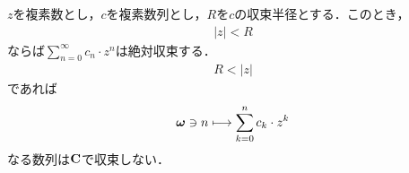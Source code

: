 	\begin{screen}
		\begin{thm}
		\label{thm:absolutely_converge_inside_the_convergence_circle}
			$z$を複素数とし，$c$を複素数列とし，$R$を$c$の収束半径とする．このとき，
			\begin{align}
				|z| < R
			\end{align}
			ならば$\sum_{n=0}^{\infty} c_n \cdot z^n$は絶対収束する．
			\begin{align}
				R < |z|
			\end{align}
			であれば
			\begin{align}
				{\boldsymbol \omega} \ni n \longmapsto \sum_{k=0}^{n} c_{k} \cdot z^{k}
			\end{align}
			なる数列は$\mathbf{C}$で収束しない．
		\end{thm}
	\end{screen}
	

